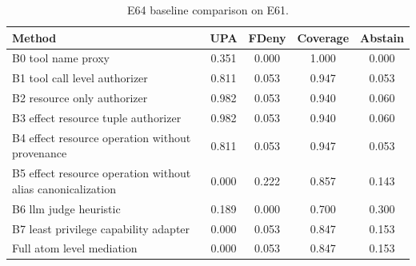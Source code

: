 \begin{table}[t]
\centering
\small
\caption{E64 baseline comparison on E61.}
\label{tab:baselines-e61}
\begin{tabular}{lcccc}
\toprule
Method & UPA & FDeny & Coverage & Abstain \\
\midrule
B0 tool name proxy & 0.351 & 0.000 & 1.000 & 0.000 \\
B1 tool call level authorizer & 0.811 & 0.053 & 0.947 & 0.053 \\
B2 resource only authorizer & 0.982 & 0.053 & 0.940 & 0.060 \\
B3 effect resource tuple authorizer & 0.982 & 0.053 & 0.940 & 0.060 \\
B4 effect resource operation without provenance & 0.811 & 0.053 & 0.947 & 0.053 \\
B5 effect resource operation without alias canonicalization & 0.000 & 0.222 & 0.857 & 0.143 \\
B6 llm judge heuristic & 0.189 & 0.000 & 0.700 & 0.300 \\
B7 least privilege capability adapter & 0.000 & 0.053 & 0.847 & 0.153 \\
Full atom level mediation & 0.000 & 0.053 & 0.847 & 0.153 \\
\bottomrule
\end{tabular}
\end{table}
